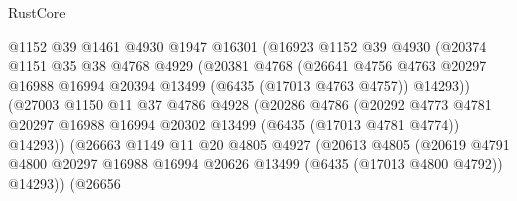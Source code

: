 \begin{lexlean}{RustCore}
\begin{coremodule}
                          @1152
                          @39
                          @1461
                          @4930
                          @1947
                          @16301
                          (@16923
                            @1152
                            @39
                            @4930
                            (@20374
                              @1151
                              @35
                              @38
                              @4768
                              @4929
                              (@20381
                                @4768
                                (@26641
                                  @4756
                                  @4763
                                  @20297
                                  @16988
                                  @16994
                                  @20394
                                  @13499
                                  (@6435 (@17013 @4763 @4757))
                                  @14293))
                              (@27003
                                @1150
                                @11
                                @37
                                @4786
                                @4928
                                (@20286
                                  @4786
                                  (@20292
                                    @4773
                                    @4781
                                    @20297
                                    @16988
                                    @16994
                                    @20302
                                    @13499
                                    (@6435 (@17013 @4781 @4774))
                                    @14293))
                                (@26663
                                  @1149
                                  @11
                                  @20
                                  @4805
                                  @4927
                                  (@20613
                                    @4805
                                    (@20619
                                      @4791
                                      @4800
                                      @20297
                                      @16988
                                      @16994
                                      @20626
                                      @13499
                                      (@6435 (@17013 @4800 @4792))
                                      @14293))
                                  (@26656

\end{coremodule}
\end{lexlean}
